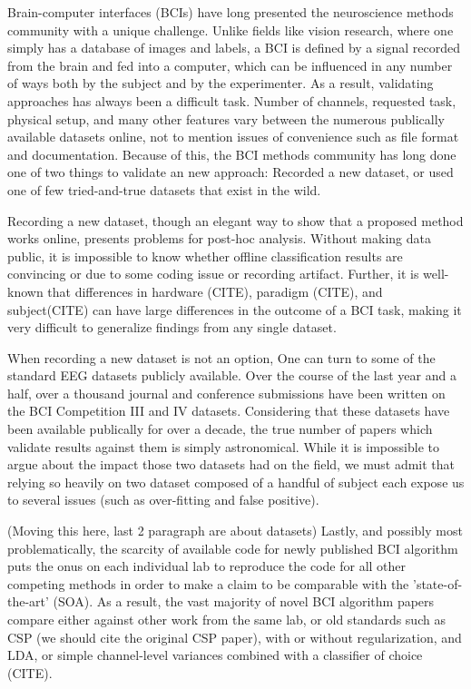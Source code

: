 Brain-computer interfaces (BCIs) have long presented the neuroscience methods
community with a unique challenge. Unlike fields like vision research, where one
simply has a database of images and labels, a BCI is defined by a signal
recorded from the brain and fed into a computer, which can be influenced in any
number of ways both by the subject and by the experimenter. As a result,
validating approaches has always been a difficult task. Number of channels,
requested task, physical setup, and many other features vary between the
numerous publically available datasets online, not to mention issues of
convenience such as file format and documentation. Because of this, the BCI
methods community has long done one of two things to validate an new approach:
Recorded a new dataset, or used one of few tried-and-true datasets that exist in
the wild.

Recording a new dataset, though an elegant way to show that a proposed method
works online, presents problems for post-hoc analysis. Without making 
data public, it is impossible to know whether offline classification results are
convincing or due to some coding issue or recording artifact. Further, it is
well-known that differences in hardware (CITE), paradigm (CITE), and
subject(CITE) can have large differences in the outcome of a BCI task, making it
very difficult to generalize findings from any single dataset.

When recording a new dataset is not an option, One can turn to some of the standard EEG datasets publicly available. Over the course of the last year and a half, over a thousand journal and
conference submissions have been written on the BCI Competition III
\cite{Blankertz2006,Schloegl2005} and IV \cite{Tangermann2012} datasets. Considering that
these datasets have been available publically for over a decade,  the
true number of papers which validate results against them is simply
astronomical. While it is impossible to argue about the impact those two datasets had on the field,
we must admit that relying so heavily on two dataset composed of a handful of subject each expose us to several issues (such as over-fitting and false positive).

(Moving this here, last 2 paragraph are about datasets)
Lastly, and possibly most
problematically, the scarcity of available code for newly published BCI algorithm puts the onus on each individual lab to reproduce the code
for all other competing methods in order to make a claim to be comparable with
the 'state-of-the-art' (SOA). As a result, the vast majority of novel BCI algorithm
papers compare either against other work from the same lab, or old standards
such as CSP \cite{Lotte2011} (we should cite the original CSP paper), with or without regularization, and LDA, or simple
channel-level variances combined with a classifier of choice (CITE). 

